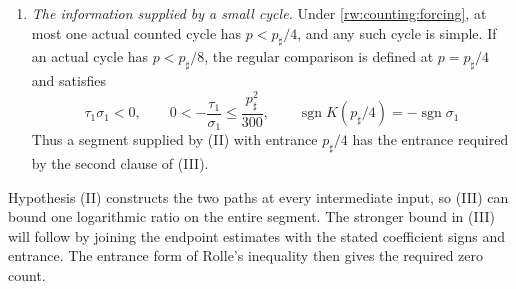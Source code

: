 \begin{enumerate}
\item[\textup{(IV)}] \emph{The information supplied by a small cycle.}
Under \eqref{rw:counting:forcing}, at most one actual counted cycle has
$p<p_\sharp/4$, and any such cycle is simple.  If an actual cycle
has $p<p_\sharp/8$, the regular comparison is defined at
$p=p_\sharp/4$ and satisfies
\begin{equation}\label{rw:counting:small-entrance}
 \tau_1\sigma_1<0,\qquad
 0<-\frac{\tau_1}{\sigma_1}\le\frac{p_\sharp^2}{300},\qquad
 \operatorname{sgn}K(p_\sharp/4)=-\operatorname{sgn}\sigma_1
\end{equation}
Thus a segment supplied by (II) with entrance $p_\sharp/4$ has the
entrance required by the second clause of (III).
\end{enumerate}

Hypothesis (II) constructs the two paths at every intermediate input,
so (III) can bound one logarithmic ratio on the entire segment.  The
stronger bound in (III) will follow by joining the endpoint estimates
with the stated coefficient signs and entrance.  The entrance form of
Rolle's inequality then gives the required zero count.

